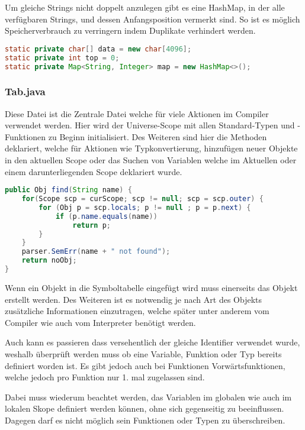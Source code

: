 Um gleiche Strings nicht doppelt anzulegen gibt es eine HashMap, in der alle verf\"ugbaren Strings, und dessen Anfangsposition vermerkt sind. So ist es m\"oglich Speicherverbrauch zu verringern indem Duplikate verhindert werden.

\begin{lstlisting}[language=Java]
static private char[] data = new char[4096];
static private int top = 0;
static private Map<String, Integer> map = new HashMap<>();
\end{lstlisting}

\subsubsection{Tab.java}

Diese Datei ist die Zentrale Datei welche f\"ur viele Aktionen im Compiler verwendet werden. Hier wird der Universe-Scope mit allen Standard-Typen und -Funktionen zu Beginn initialisiert. Des Weiteren sind hier die Methoden deklariert, welche f\"ur Aktionen wie Typkonvertierung, hinzuf\"ugen neuer Objekte in den aktuellen Scope oder das Suchen von Variablen welche im Aktuellen oder einem darunterliegenden Scope deklariert wurde.

\begin{lstlisting}[language=Java]
public Obj find(String name) {
	for(Scope scp = curScope; scp != null; scp = scp.outer) {
		for (Obj p = scp.locals; p != null ; p = p.next) {
			if (p.name.equals(name))
				return p;
		}
	}
	parser.SemErr(name + " not found");
	return noObj;
}
\end{lstlisting}


Wenn ein Objekt in die Symboltabelle eingef\"ugt wird muss einerseits das Objekt erstellt werden. Des Weiteren ist es notwendig je nach Art des Objekts zus\"atzliche Informationen einzutragen, welche sp\"ater unter anderem vom Compiler wie auch vom Interpreter ben\"otigt werden.

Auch kann es passieren dass versehentlich der gleiche Identifier verwendet wurde, weshalb \"uberpr\"uft werden muss ob eine Variable, Funktion oder Typ bereits definiert worden ist. Es gibt jedoch auch bei Funktionen Vorw\"artsfunktionen, welche jedoch pro Funktion nur 1. mal zugelassen sind.

Dabei muss wiederum beachtet werden, das Variablen im globalen wie auch im lokalen Skope definiert werden k\"onnen, ohne sich gegenseitig zu beeinflussen. Dagegen darf es nicht m\"oglich sein Funktionen oder Typen zu \"uberschreiben.

